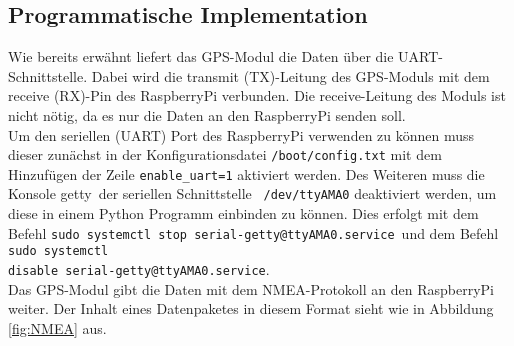 \subsection{Programmatische Implementation}
\label{subsec:GPSprogram}
Wie bereits erwähnt liefert das GPS-Modul die Daten über die UART-Schnittstelle. Dabei wird die transmit (TX)-Leitung des GPS-Moduls mit dem receive (RX)-Pin des RaspberryPi verbunden. Die receive-Leitung des Moduls ist nicht nötig, da es nur die Daten an den RaspberryPi senden soll.\\
Um den seriellen (UART) Port des RaspberryPi verwenden zu können muss dieser zunächst in der Konfigurationsdatei  \verb|/boot/config.txt| mit dem Hinzufügen der Zeile \verb|enable_uart=1| aktiviert werden. Des Weiteren muss die Konsole \glqq getty\grqq\ der seriellen Schnittstelle \verb| /dev/ttyAMA0| deaktiviert werden, um diese in einem Python Programm einbinden zu können. Dies erfolgt mit dem Befehl \verb|sudo systemctl stop serial-getty@ttyAMA0.service|\ und dem Befehl \verb|sudo systemctl|\\
\verb|disable serial-getty@ttyAMA0.service|.\\
Das \ac{GPS}-Modul gibt die Daten mit dem \ac{NMEA}-Protokoll an den RaspberryPi weiter. Der Inhalt eines Datenpaketes in diesem Format sieht wie in Abbildung \ref{fig:NMEA} aus. 
